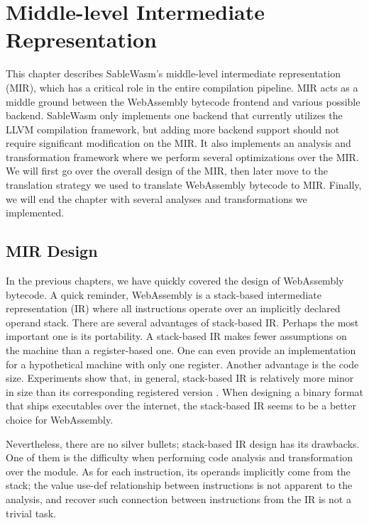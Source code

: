 \chapter{Middle-level Intermediate Representation}

This chapter describes SableWasm's middle-level intermediate representation (MIR), which has a critical role in the entire compilation pipeline. MIR acts as a middle ground between the WebAssembly bytecode frontend and various possible backend. SableWasm only implements one backend that currently utilizes the LLVM compilation framework, but adding more backend support should not require significant modification on the MIR. It also implements an analysis and transformation framework where we perform several optimizations over the MIR. We will first go over the overall design of the MIR, then later move to the translation strategy we used to translate WebAssembly bytecode to MIR. Finally, we will end the chapter with several analyses and transformations we implemented.

\section{MIR Design}

In the previous chapters, we have quickly covered the design of WebAssembly bytecode. A quick reminder, WebAssembly is a stack-based intermediate representation (IR) where all instructions operate over an implicitly declared operand stack. There are several advantages of stack-based IR. Perhaps the most important one is its portability. A stack-based IR makes fewer assumptions on the machine than a register-based one.  One can even provide an implementation for a hypothetical machine with only one register. Another advantage is the code size. Experiments show that, in general, stack-based IR is relatively more minor in size than its corresponding registered version \cite{stack-and-register-vm}. When designing a binary format that ships executables over the internet, the stack-based IR seems to be a better choice for WebAssembly.

Nevertheless, there are no silver bullets; stack-based IR design has its drawbacks. One of them is the difficulty when performing code analysis and transformation over the module. As for each instruction, its operands implicitly come from the stack; the value use-def relationship between instructions is not apparent to the analysis, and recover such connection between instructions from the IR is not a trivial task.

